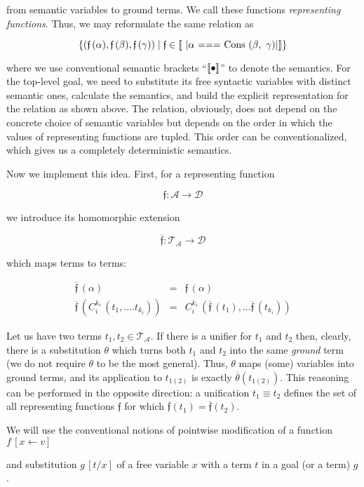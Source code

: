 from semantic variables to ground terms. We call these functions \emph{representing functions}. Thus, we may reformulate the same relation as

\[
\{(\mathfrak{f}\,(\alpha),\mathfrak{f}\,(\beta),\mathfrak{f}\,(\gamma))\mid\mathfrak{f}\in\sembr{\mbox{\lstinline|$\alpha$ === Cons ($\beta$, $\,\gamma$)|}}\}
\]

where we use conventional semantic brackets ``$\llbracket{\bullet}\rrbracket$'' to denote the semantics. For the top-level goal, we need to substitute its free syntactic
variables with distinct semantic ones, calculate the semantics, and build the explicit representation for the relation as shown above. The relation, obviously,
does not depend on the concrete choice of semantic variables but depends on the order in which the values of representing functions are tupled. This order can be
conventionalized, which gives us a completely deterministic semantics.

Now we implement this idea. First, for a representing function

\[
\mathfrak{f} : \mathcal{A}\to\mathcal{D}
\]

we introduce its homomorphic extension 

\[
  \overline{\mathfrak{f}}:\mathcal{T_A}\to\mathcal{D}
\]

which maps terms to terms:

\[
\begin{array}{rcl}
  \overline{\mathfrak f}\,(\alpha) & = & \mathfrak f\,(\alpha)\\
  \overline{\mathfrak f}\,(C_i^{k_i}\,(t_1,\dots.t_{k_i})) & = & C_i^{k_i}\,(\overline{\mathfrak f}\,(t_1),\dots \overline{\mathfrak f}\,(t_{k_i}))
\end{array}
\]

Let us have two terms $t_1, t_2\in\mathcal{T_A}$. If there is a unifier for $t_1$ and $t_2$ then, clearly, there is a substitution $\theta$ which
turns both $t_1$ and $t_2$ into the same \emph{ground} term (we do not require $\theta$ to be the most general). Thus, $\theta$ maps
(some) variables into ground terms, and its application to $t_{1(2)}$ is exactly $\overline{\theta}(t_{1(2)})$. This reasoning can be
performed in the opposite direction: a unification $t_1\equiv t_2$ defines the set of all representing functions $\mathfrak{f}$ for which
$\overline{\mathfrak{f}}(t_1)=\overline{\mathfrak{f}}(t_2)$.

We will use the conventional notions of pointwise modification of a function $f\,[x\gets v]$
\begin{comment}
\[
f\,[x\gets v]\,(z)=\left\{
\begin{array}{rcl}
  f\,(z) &,& z \ne x \\
  v      &,& z = x
\end{array}
\right.
\]
\end{comment}
and substitution $g\,[t/x]$ of a free variable $x$ with a term $t$ in a goal (or a term) $g$.

